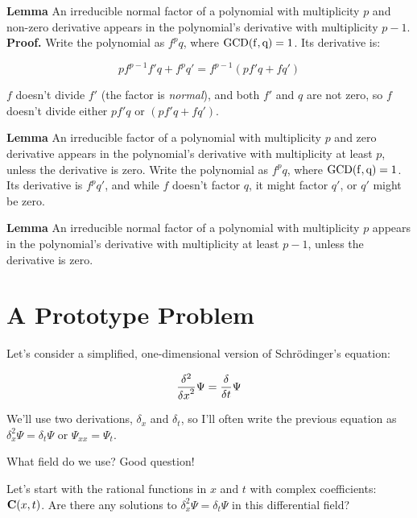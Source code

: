 \documentclass{article}
\newcommand{\GCD}{\ensuremath{\rm{GCD}}}
\begin{document}
{\bf Lemma} An irreducible normal factor of a polynomial with multiplicity
$p$ and non-zero derivative appears in the polynomial's derivative
with multiplicity $p-1$.  {\bf Proof.}  Write the polynomial as $f^p q$, where
$\GCD(f,q)=1$.  Its derivative is:

$$p f^{p-1} f' q + f^p q' = f^{p-1}(pf'q + fq')$$

$f$ doesn't divide $f'$ (the factor is {\it normal}), and both $f'$
and $q$ are not zero, so $f$ doesn't divide either $pf'q$ or
$(pf'q+fq')$.

{\bf Lemma} An irreducible factor of a polynomial with multiplicity
$p$ and zero derivative appears in the polynomial's derivative with
multiplicity at least $p$, unless the derivative is zero.  Write the
polynomial as $f^p q$, where $\GCD(f,q)=1$.  Its derivative is $f^p
q'$, and while $f$ doesn't factor $q$, it might factor $q'$, or
$q'$ might be zero.

{\bf Lemma} An irreducible normal factor of a polynomial with multiplicity
$p$ appears in the polynomial's derivative with multiplicity at least
$p-1$, unless the derivative is zero.

\vfill\eject
\section*{A Prototype Problem}

Let's consider a simplified, one-dimensional version of Schr\"odinger's equation:

$${{\delta^2}\over{\delta x}^2} \Psi = {\delta\over{\delta t}} \Psi$$

We'll use two derivations, $\delta_x$ and $\delta_t$, so I'll often
write the previous equation as $\delta_x^2 \Psi = \delta_t \Psi$
or $\Psi_{xx} = \Psi_{t}$.

What field do we use?  Good question!

Let's start with the rational functions in $x$ and $t$ with
complex coefficients: ${\bf C}(x,t)$.  Are there any solutions
to $\delta_x^2\Psi = \delta_t\Psi$ in this differential field?
\end{document}
